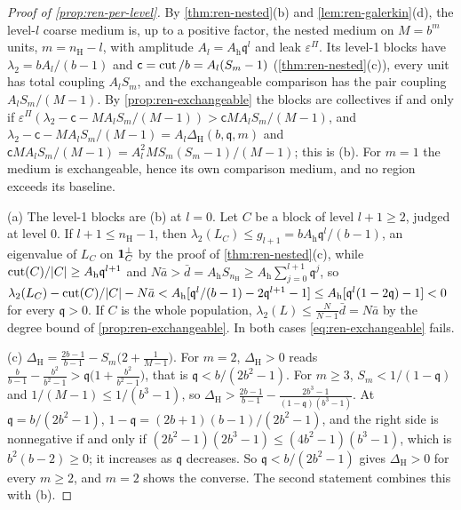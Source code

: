 \begin{proof}[Proof of \cref{prop:ren-per-level}]
By \cref{thm:ren-nested}(b) and \cref{lem:ren-galerkin}(d), the level-$l$ coarse medium is, up to a positive factor, the nested medium on $M=b^m$ units, $m=n_{\mathrm H}-l$, with amplitude $A_l=A_{\mathrm h}\mathfrak q^l$ and leak $\varepsilon^\Pi$. Its level-1 blocks have $\lambda_2=bA_l/(b-1)$ and $\mathsf c=\operatorname{cut}/b=A_l(S_m-1)$ (\cref{thm:ren-nested}(c)), every unit has total coupling $A_lS_m$, and the exchangeable comparison has the pair coupling $A_lS_m/(M-1)$. By \cref{prop:ren-exchangeable} the blocks are collectives if and only if $\varepsilon^\Pi(\lambda_2-\mathsf c-MA_lS_m/(M-1))>\mathsf cMA_lS_m/(M-1)$, and $\lambda_2-\mathsf c-MA_lS_m/(M-1)=A_l\Delta_{\mathrm H}(b,\mathfrak q,m)$ and $\mathsf cMA_lS_m/(M-1)=A_l^2MS_m(S_m-1)/(M-1)$; this is (b). For $m=1$ the medium is exchangeable, hence its own comparison medium, and no region exceeds its baseline.

(a) The level-1 blocks are (b) at $l=0$. Let $C$ be a block of level $l+1\ge2$, judged at level 0. If $l+1\le n_{\mathrm H}-1$, then $\lambda_2(L_C)\le g_{l+1}=bA_{\mathrm h}\mathfrak q^l/(b-1)$, an eigenvalue of $L_C$ on $\mathbf{1}_C^\perp$ by the proof of \cref{thm:ren-nested}(c), while $\operatorname{cut}(C)/\lvert C\rvert\ge A_{\mathrm h}\mathfrak q^{l+1}$ and $N\bar a>\bar d=A_{\mathrm h}S_{n_{\mathrm H}}\ge A_{\mathrm h}\sum_{j=0}^{l+1}\mathfrak q^j$, so $\lambda_2(L_C)-\operatorname{cut}(C)/\lvert C\rvert-N\bar a<A_{\mathrm h}[\mathfrak q^l/(b-1)-2\mathfrak q^{l+1}-1]\le A_{\mathrm h}[\mathfrak q^l(1-2\mathfrak q)-1]<0$ for every $\mathfrak q>0$. If $C$ is the whole population, $\lambda_2(L)\le\frac N{N-1}\bar d=N\bar a$ by the degree bound of \cref{prop:ren-exchangeable}. In both cases \eqref{eq:ren-exchangeable} fails.

(c) $\Delta_{\mathrm H}=\frac{2b-1}{b-1}-S_m\bigl(2+\frac1{M-1}\bigr)$. For $m=2$, $\Delta_{\mathrm H}>0$ reads $\frac b{b-1}-\frac{b^2}{b^2-1}>\mathfrak q\bigl(1+\frac{b^2}{b^2-1}\bigr)$, that is $\mathfrak q<b/(2b^2-1)$. For $m\ge3$, $S_m<1/(1-\mathfrak q)$ and $1/(M-1)\le1/(b^3-1)$, so $\Delta_{\mathrm H}>\frac{2b-1}{b-1}-\frac{2b^3-1}{(1-\mathfrak q)(b^3-1)}$. At $\mathfrak q=b/(2b^2-1)$, $1-\mathfrak q=(2b+1)(b-1)/(2b^2-1)$, and the right side is nonnegative if and only if $(2b^2-1)(2b^3-1)\le(4b^2-1)(b^3-1)$, which is $b^2(b-2)\ge0$; it increases as $\mathfrak q$ decreases. So $\mathfrak q<b/(2b^2-1)$ gives $\Delta_{\mathrm H}>0$ for every $m\ge2$, and $m=2$ shows the converse. The second statement combines this with (b).


\end{proof}
